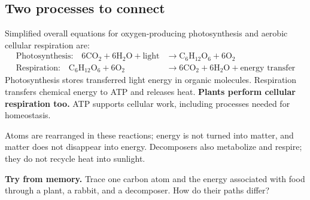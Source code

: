 \documentclass[11pt,letterpaper]{article}
\newcommand{\memorycheck}[1]{\par\smallskip\textbf{Try from memory.} #1\par}
\begin{document}
\subsection*{Two processes to connect}
Simplified overall equations for oxygen-producing photosynthesis and aerobic cellular respiration are:
\begin{align*}
\text{Photosynthesis:}\quad 6\mathrm{CO_2}+6\mathrm{H_2O}+\text{light}
&\longrightarrow \mathrm{C_6H_{12}O_6}+6\mathrm{O_2}\\
\text{Respiration:}\quad \mathrm{C_6H_{12}O_6}+6\mathrm{O_2}
&\longrightarrow 6\mathrm{CO_2}+6\mathrm{H_2O}+\text{energy transfer}
\end{align*}
Photosynthesis stores transferred light energy in organic molecules. Respiration transfers chemical energy to ATP and releases heat. \textbf{Plants perform cellular respiration too.} ATP supports cellular work, including processes needed for homeostasis.

Atoms are rearranged in these reactions; energy is not turned into matter, and matter does not disappear into energy. Decomposers also metabolize and respire; they do not recycle heat into sunlight.
\memorycheck{Trace one carbon atom and the energy associated with food through a plant, a rabbit, and a decomposer. How do their paths differ?}
\end{document}
